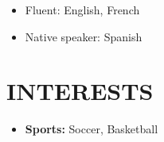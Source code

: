 \documentclass{res}
\begin{document}
\begin{resume}
	\begin{itemize}[leftmargin=\parindent]
	\setlength{\itemsep}{0mm}
	\item[] Fluent: English, French
	\item[] Native speaker: Spanish
	\end{itemize}
	
	
	
	\section{\MakeUppercase{Interests}} \vskip 0.35in
	
	\begin{itemize}[leftmargin=\parindent]
	\setlength{\itemsep}{0mm}
	\item[] {\bf Sports:} Soccer, Basketball
	\end{itemize}
	
	
	
	\end{resume}
	
\end{document}
